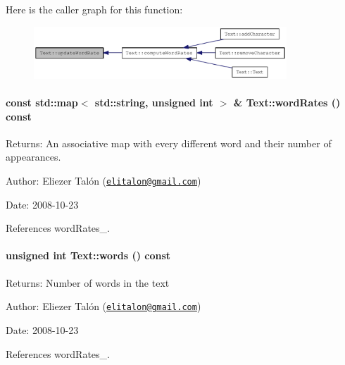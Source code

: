 Here is the caller graph for this function:\nopagebreak
\begin{figure}[H]
\begin{center}
\leavevmode
\includegraphics[width=269pt]{class_text_5ab8f9bfa566de537a167991fe10eff5_icgraph}
\end{center}
\end{figure}
\hypertarget{class_text_f1588ae161a4c4894b2ce1a1d29ebc22}{
\paragraph[{wordRates}]{\setlength{\rightskip}{0pt plus 5cm}const std::map$<$ std::string, unsigned int $>$ \& Text::wordRates () const}\hfill}
\label{class_text_f1588ae161a4c4894b2ce1a1d29ebc22}


\begin{Desc}
\item[Returns:]An associative map with every different word and their number of appearances.\end{Desc}
\begin{Desc}
\item[Author:]Eliezer Talón (\href{mailto:elitalon@gmail.com}{\tt elitalon@gmail.com}) \end{Desc}
\begin{Desc}
\item[Date:]2008-10-23 \end{Desc}


References wordRates\_\-.\hypertarget{class_text_edfd71af7802a2d72eed7365f081a66d}{
\paragraph[{words}]{\setlength{\rightskip}{0pt plus 5cm}unsigned int Text::words () const}\hfill}
\label{class_text_edfd71af7802a2d72eed7365f081a66d}


\begin{Desc}
\item[Returns:]Number of words in the text\end{Desc}
\begin{Desc}
\item[Author:]Eliezer Talón (\href{mailto:elitalon@gmail.com}{\tt elitalon@gmail.com}) \end{Desc}
\begin{Desc}
\item[Date:]2008-10-23 \end{Desc}


References wordRates\_\-.